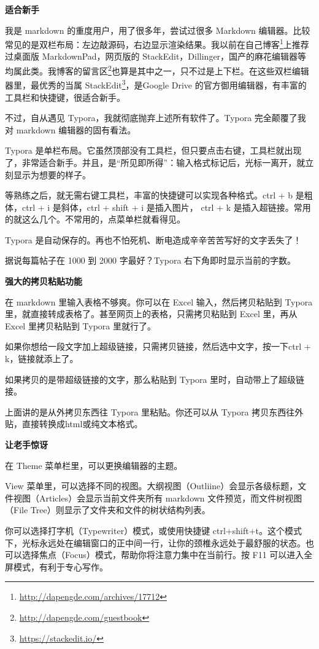 \documentclass[]{ctexbook}
\renewcommand{\href}[2]{#2\footnote{\url{#1}}}
\begin{document}
\textbf{适合新手}

我是 markdown 的重度用户，用了很多年，尝试过很多 Markdown 编辑器。比较常见的是双栏布局：左边敲源码，右边显示渲染结果。我以前在\href{http://dapengde.com/archives/17712}{自己博客}上推荐过桌面版 MarkdownPad，网页版的 StackEdit，Dillinger，国产的麻花编辑器等均属此类。我\href{http://dapengde.com/guestbook}{博客的留言区}也算是其中之一，只不过是上下栏。在这些双栏编辑器里，最优秀的当属 \href{https://stackedit.io/}{StackEdit}，是Google Drive 的官方御用编辑器，有丰富的工具栏和快捷键，很适合新手。

不过，自从遇见 Typora，我就彻底抛弃上述所有软件了。Typora 完全颠覆了我对 markdown 编辑器的固有看法。

Typora 是单栏布局。它虽然顶部没有工具栏，但只要点击右键，工具栏就出现了，非常适合新手。并且，是``所见即所得''：输入格式标记后，光标一离开，就立刻显示为想要的样子。

等熟练之后，就无需右键工具栏，丰富的快捷键可以实现各种格式。ctrl + b 是粗体，ctrl + i 是斜体，ctrl + shift + i 是插入图片， ctrl + k 是插入超链接。常用的就这么几个。不常用的，点菜单栏就看得见。

Typora 是自动保存的。再也不怕死机、断电造成辛辛苦苦写好的文字丢失了！

据说每篇帖子在 1000 到 2000 字最好？Typora 右下角即时显示当前的字数。

\textbf{强大的拷贝粘贴功能}

在 markdown 里输入表格不够爽。你可以在 Excel 输入，然后拷贝粘贴到 Typora 里，就直接转成表格了。甚至网页上的表格，只需拷贝粘贴到 Excel 里，再从 Excel 里拷贝粘贴到 Typora 里就行了。

如果你想给一段文字加上超级链接，只需拷贝链接，然后选中文字，按一下ctrl + k，链接就添上了。

如果拷贝的是带超级链接的文字，那么粘贴到 Typora 里时，自动带上了超级链接。

上面讲的是从外拷贝东西往 Typora 里粘贴。你还可以从 Typora 拷贝东西往外贴，直接转换成html或纯文本格式。

\textbf{让老手惊讶}

在 Theme 菜单栏里，可以更换编辑器的主题。

View 菜单里，可以选择不同的视图。大纲视图（Outliine）会显示各级标题，文件视图（Articles）会显示当前文件夹所有 markdown 文件预览，而文件树视图（File Tree）则显示了文件夹和文件的树状结构列表。

你可以选择打字机（Typewriter）模式，或使用快捷键 ctrl+shift+t。这个模式下，光标永远处在编辑窗口的正中间一行，让你的颈椎永远处于最舒服的状态。也可以选择焦点（Focus）模式，帮助你将注意力集中在当前行。按 F11 可以进入全屏模式，有利于专心写作。
\end{document}
